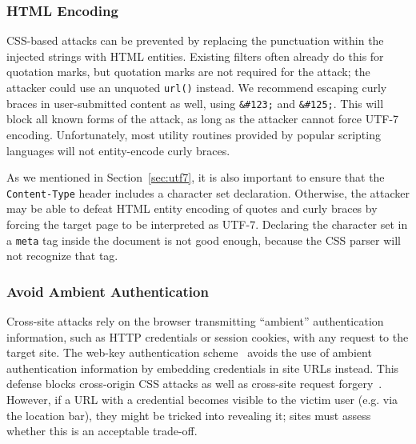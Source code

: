 \documentclass{sig-alternate}
\begin{document}
\subsubsection{HTML Encoding}
CSS-based attacks can be prevented by replacing the punctuation
within the injected strings with HTML entities. Existing filters
often already do this for quotation marks, but quotation marks
are not required for the attack; the attacker could use an
unquoted \texttt{url()} instead. We recommend escaping curly
braces in user-submitted content as well, using \verb|&#123;|
and \verb|&#125;|. This will block all known forms of the
attack, as long as the attacker cannot force UTF-7 encoding.
Unfortunately, most utility routines provided by popular
scripting languages will not entity-encode curly braces.

As we mentioned in Section~\ref{sec:utf7}, it is also important
to ensure that the \texttt{Content-Type} header includes a
character set declaration. Otherwise, the attacker may be able
to defeat HTML entity encoding of quotes and curly braces by
forcing the target page to be interpreted as UTF-7. Declaring
the character set in a \texttt{meta} tag inside the document is
not good enough, because the CSS parser will not recognize that
tag.


\subsubsection{Avoid Ambient Authentication}
Cross-site attacks rely on the browser transmitting ``ambient''
authentication information, such as HTTP credentials or session
cookies, with any request to the target site.  
The web-key authentication scheme~\cite{webkey} avoids the use of ambient
authentication information by embedding credentials
in site URLs instead.  This defense blocks cross-origin CSS attacks
as well as cross-site request forgery~\cite{csrf}.
However, if a URL with a credential becomes
visible to the victim user (e.g. via the location bar), they might be
tricked into revealing it; sites must assess whether this is an
acceptable trade-off.

\end{document}
